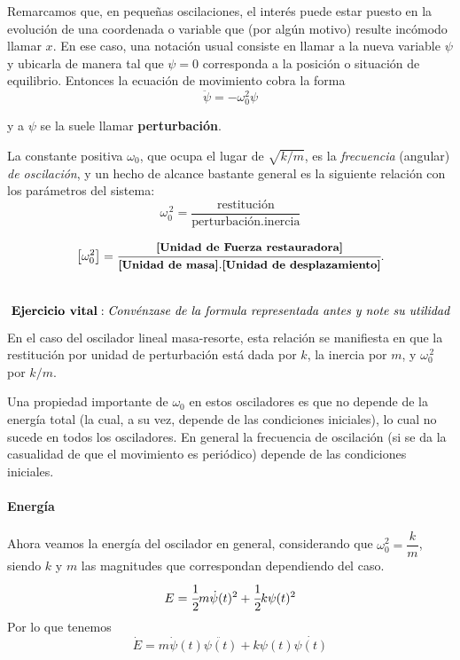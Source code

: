 \documentclass[a4paper,spanish]{article}
\numberwithin{equation}{section}
\begin{document}
Remarcamos que, en peque\~nas oscilaciones, el inter\'es puede estar puesto en la evoluci\'on de una coordenada o variable que (por alg\'un motivo) resulte inc\'omodo llamar $x$. En ese caso, una notaci\'on usual consiste en llamar a la nueva variable $\psi$ y ubicarla de manera tal que $\psi=0$ corresponda a la posici\'on o situaci\'on de equilibrio. Entonces la ecuaci\'on de movimiento cobra la forma
		\begin{equation}
        \ddot{\psi} = -\omega_0^2 \psi
        \label{eq:oscilador}
    \end{equation}
    
y a $\psi$ se la suele llamar \textbf{perturbaci\'on}.

La constante positiva $\omega_0$, que ocupa el lugar de $\sqrt{k/m}$, es la \textit{frecuencia} (angular) \textit{de oscilaci\'on}, y un hecho de alcance bastante general es la siguiente relaci\'on con los par\'ametros del sistema:
		\begin{equation}
			\omega_0^{\,2} =\frac{\text{restituci\'on}}{\text{perturbaci\'on.inercia}}
		\end{equation}

 \[ \left[\omega_0 ^2\right] = \cfrac{\begin{small}{\textbf{[Unidad de Fuerza restauradora]}}\end{small}}{\begin{small}{\textbf{[Unidad de masa]}}\end{small}.
    \begin{small}{\textbf{[Unidad de desplazamiento]}}\end{small}}.
 \]
\\
    \[\textbf{Ejercicio vital}: \textit{Conv\'enzase\ de\ la\ formula\ representada\ antes\
    y\ note\ su\ utilidad}\] 
En el caso del oscilador lineal masa-resorte, esta relaci\'on se manifiesta en que la restituci\'on por unidad de perturbaci\'on est\'a dada por $k$, la inercia por $m$, y $\omega_0^{\,2}$ por $k/m$.

Una propiedad importante de $\omega_0$ en estos osciladores es que no depende de la energ\'ia total (la cual, a su vez, depende de las condiciones iniciales), lo cual no sucede en todos los osciladores. En general la frecuencia de oscilaci\'on (si se da la casualidad de que el movimiento es peri\'odico) depende de las condiciones iniciales.

      
\paragraph{Energ\'ia}
    Ahora veamos la energ\'ia del oscilador en general, considerando que
    $\omega_0^2 = \dfrac{k}{m}$, siendo $k$ y $m$ las magnitudes que correspondan
    dependiendo del caso.
    \begin{equation}
        E = \cfrac{1}{2} m \dot{\psi}(t)^2 + \cfrac{1}{2} k \psi(t)^2
        \label{eq:oscilador_energia}
    \end{equation}
Por lo que tenemos
    \begin{equation}
        \dot {E} = m \dot{\psi}(t)\ddot{\psi(t)} + k \psi(t)\dot{\psi(t)}
        \label{energia_oscilador_derivada}
    \end{equation}
\end{document}
